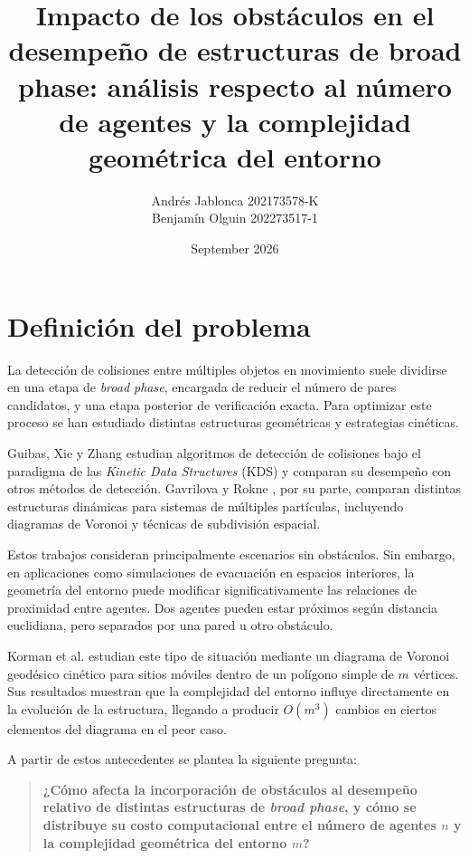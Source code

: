 \documentclass[12pt]{article}
\title{Impacto de los obstáculos en el desempeño de estructuras de broad phase: análisis respecto al número de agentes y la complejidad geométrica del entorno}
\author{Andrés Jablonca 202173578-K\\Benjamín Olguin 202273517-1}
\date{September 2026}
\begin{document}
\maketitle

\section{Definición del problema}

La detección de colisiones entre múltiples objetos en movimiento suele dividirse en una etapa de \textit{broad phase}, encargada de reducir el número de pares candidatos, y una etapa posterior de verificación exacta. Para optimizar este proceso se han estudiado distintas estructuras geométricas y estrategias cinéticas.

Guibas, Xie y Zhang \cite{guibas2001kinetic} estudian algoritmos de detección de colisiones bajo el paradigma de las \textit{Kinetic Data Structures} (KDS) y comparan su desempeño con otros métodos de detección. Gavrilova y Rokne \cite{gavrilova2003collision}, por su parte, comparan distintas estructuras dinámicas para sistemas de múltiples partículas, incluyendo diagramas de Voronoi y técnicas de subdivisión espacial.

Estos trabajos consideran principalmente escenarios sin obstáculos. Sin embargo, en aplicaciones como simulaciones de evacuación en espacios interiores, la geometría del entorno puede modificar significativamente las relaciones de proximidad entre agentes. Dos agentes pueden estar próximos según distancia euclidiana, pero separados por una pared u otro obstáculo.

Korman et al. \cite{korman2023kinetic} estudian este tipo de situación mediante un diagrama de Voronoi geodésico cinético para sitios móviles dentro de un polígono simple de \(m\) vértices. Sus resultados muestran que la complejidad del entorno influye directamente en la evolución de la estructura, llegando a producir \(O(m^3)\) cambios en ciertos elementos del diagrama en el peor caso.

A partir de estos antecedentes se plantea la siguiente pregunta:

\begin{quote}
\textbf{¿Cómo afecta la incorporación de obstáculos al desempeño relativo de distintas estructuras de \textit{broad phase}, y cómo se distribuye su costo computacional entre el número de agentes \(n\) y la complejidad geométrica del entorno \(m\)?}
\end{quote}
\end{document}
